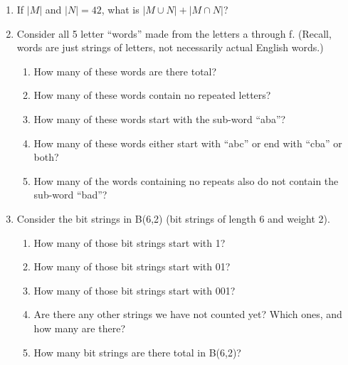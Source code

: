 \documentclass[11pt, letterpaper, includehead]{article}
\theoremstyle{plain}
\theoremstyle{mydefinition}
\theoremstyle{myproperty}
\begin{document}
\begin{enumerate}[label=\textbf{\arabic*}., leftmargin=*]
\item If $|M|$ and $|N| = 42$, what is $|M \cup N| + |M \cap N|$?
\item Consider all 5 letter ``words'' made from the letters a through f. (Recall, words are just strings of letters, not necessarily actual English words.)
\begin{enumerate}[label=(\alph*)]
    \item How many of these words are there total?
    \item How many of these words contain no repeated letters?
    \item How many of these words start with the sub-word ``aba''?
    \item How many of these words either start with ``abc'' or end with ``cba'' or both?
    \item How many of the words containing no repeats also do not contain the sub-word ``bad''?
\end{enumerate}

\item Consider the bit strings in B(6,2) (bit strings of length 6 and weight 2).
\begin{enumerate}[label=(\alph*)]
    \item How many of those bit strings start with 1?
    \item How many of those bit strings start with 01?
    \item How many of those bit strings start with 001?
    \item Are there any other strings we have not counted yet? Which ones, and how many are there?
    \item How many bit strings are there total in B(6,2)?
\end{enumerate}
\end{enumerate}
\end{document}
